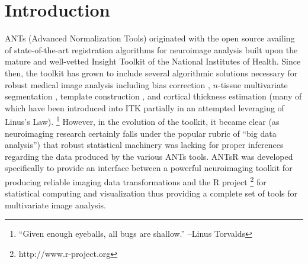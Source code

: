 \documentclass[final,5p,times,twocolumn]{elsarticle}
\begin{document}






%
%
%

\section{Introduction}

ANTs (Advanced Normalization Tools) originated with the open source availing
of state-of-the-art registration algorithms for neuroimage analysis
\cite{avants2008a} built upon the mature and well-vetted Insight Toolkit
of the National Institutes of Health.  Since then, the toolkit has grown to include 
several algorithmic solutions necessary
for robust medical image analysis including bias correction \cite{tustison2010}, 
$n$-tissue multivariate segmentation \cite{avants2011}, template construction \cite{avants2010}, 
and cortical thickness estimation \cite{das2009} (many of which have been
introduced into ITK partially in an attempted leveraging of Linus's Law).%
\footnote{
``Given enough eyeballs, all bugs are shallow.'' --Linus Torvalds
}   
However, in the evolution of the toolkit, it became clear (as neuroimaging
research certainly falls under the popular rubric of ``big data analysis'')
that robust statistical machinery was lacking for proper inferences regarding
the data produced by the various ANTs tools.
ANTsR was developed
specifically to provide an interface between a 
powerful neuroimaging toolkit for producing reliable imaging data 
transformations and the R project%
\footnote{
http://www.r-project.org
}
for statistical computing and visualization thus providing a complete
set of tools for multivariate image analysis. 
\end{document}
